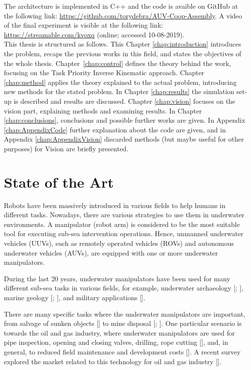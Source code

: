 The architecture is implemented in C++ and the code is avaible on GitHub at the following link:  \url{https://github.com/torydebra/AUV-Coop-Assembly}. A video of the final experiment is visible at the following link: \url{https://streamable.com/kvoxq} (online; accessed 10-08-2019).\\

This thesis is structured as follows. This Chapter \ref{chap:introduction} introduces the problem, recaps the previous works in this field, and states the objectives of the whole thesis. \mbox{Chapter \ref{chap:control}} defines the theory behind the work, focusing on the Task Priority Inverse Kinematic approach. Chapter \ref{chap:method} applies the theory explained to the actual problem, introducing new methods for the stated problem. In Chapter \ref{chap:results} the simulation set-up is described and results are discussed. Chapter \ref{chap:vision} focuses on the vision part, explaining methods and examining results. In Chapter \ref{chap:conclusions}, conclusions and possible further works are given. In Appendix \ref{chap:AppendixCode} further explanation about the code are given, and in Appendix \ref{chap:AppendixVision} discarded methods (but maybe useful for other purposes) for Vision are briefly presented.

\section{State of the Art}
\label{sec:stateArt}
Robots have been massively introduced in various fields to help humans in different tasks. Nowadays, there are various strategies to use them in underwater environments. A manipulator (robot arm) is considered to be the most suitable tool for executing sub-sea intervention operations. Hence, unmanned underwater vehicles (UUVs), such as remotely operated vehicles (ROVs) and autonomous underwater vehicles (AUVs), are equipped with one or more underwater manipulators.

During the last 20 years, underwater manipulators have been used for many different sub-sea tasks in various fields, for example, underwater archaeology [\cite{IntroApp4}; \cite{IntroApp3}], marine geology [\cite{IntroApp1}; \cite{IntroApp2}], and military applications [\cite{IntroApp5}].

There are many specific tasks where the underwater manipulators are important, from salvage of sunken objects [\cite{IntroSpecApp1}] to mine disposal [\cite{IntroSpecApp2}; \cite{IntroSpecApp3}]. One particular scenario is towards the oil and gas industry, where underwater manipulators are used for pipe inspection, opening and closing valves, drilling, rope cutting [\cite{IntroSpecApp4}], and, in general, to reduced field maintenance and development costs [\cite{IntroSpecApp5}]. A recent survey explored the market related to this technology for oil and gas industry [\cite{IntroSpecApp6}].

